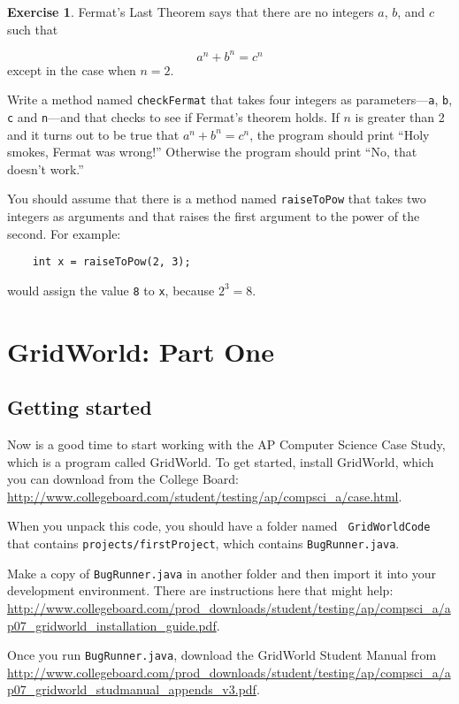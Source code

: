 \documentclass[12pt]{book}
\theoremstyle{definition}
\newtheorem{excz}{Exercise}[chapter]
\newenvironment{exercise}{\bigskip\begin{excz}\mbox{}}{\end{excz}}
\begin{document}
\begin{exercise}
Fermat's Last Theorem says that there are no integers
$a$, $b$, and $c$ such that

\[a^n + b^n = c^n \]
%
except in the case when $n=2$.

Write a method named {\tt checkFermat} that takes four
integers as parameters---{\tt a}, {\tt b}, {\tt c} and {\tt n}---and
that checks to see if Fermat's theorem holds.  If
$n$ is greater than 2 and it turns out to be true that 
$a^n + b^n = c^n$,
the program should print ``Holy smokes, Fermat was wrong!''
Otherwise the program should print ``No, that doesn't work.''

You should assume that there is a method named {\tt raiseToPow}
that takes two integers as arguments and that raises the
first argument to the power of the second.  For example:

\begin{lstlisting}
    int x = raiseToPow(2, 3);
\end{lstlisting}
%
would assign the value {\tt 8} to {\tt x}, because $2^3 = 8$.

\end{exercise}


\chapter{GridWorld: Part One}
\label{gridworld}

\section{Getting started}

Now is a good time to start working with the AP Computer Science Case
Study, which is a program called GridWorld.  To get started, install
GridWorld, which you can download from the College Board:
\url{http://www.collegeboard.com/student/testing/ap/compsci_a/case.html}.

When you unpack this code, you should have a folder named {\tt
  GridWorldCode} that contains {\tt projects/firstProject}, which
contains {\tt BugRunner.java}.

Make a copy of {\tt BugRunner.java} in another folder and then import it
into your development environment.  There are instructions here that
might help: \url{http://www.collegeboard.com/prod_downloads/student/testing/ap/compsci_a/ap07_gridworld_installation_guide.pdf}.

Once you run {\tt BugRunner.java}, download the GridWorld Student
Manual from \url{http://www.collegeboard.com/prod_downloads/student/testing/ap/compsci_a/ap07_gridworld_studmanual_appends_v3.pdf}.
\end{document}
